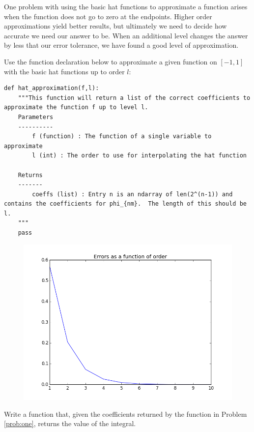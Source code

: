 One problem with using the basic hat functions to approximate a function arises when the function does not go to zero at the endpoints.  Higher order approximations yield better results, but ultimately we need to decide how accurate we need our answer to be.  When an additional level changes the answer by less that our error tolerance, we have found a good level of approximation.

 \begin{problem}
Use the function declaration below to approximate a given function on $[-1,1]$ with the basic hat functions up to order $l$:
\begin{lstlisting}
def hat_approximation(f,l):
    """This function will return a list of the correct coefficients to approximate the function f up to level l.
    Parameters
    ----------
        f (function) : The function of a single variable to approximate
        l (int) : The order to use for interpolating the hat function

    Returns
    -------
        coeffs (list) : Entry n is an ndarray of len(2^(n-1)) and contains the coefficients for phi_{nm}.  The length of this should be l.
    """
    pass
\end{lstlisting}
\label{prob:one}
\end{problem}


\begin{center}
\begin{figure}
\includegraphics[width=.7\textwidth]{errors.png}
\caption{}
\label{fig:errors}
\end{figure}
\end{center}

\begin{problem}
Write a function that, given the coefficients returned by the function in Problem \ref{prob:one}, returns the value of the integral.
\end{problem}


